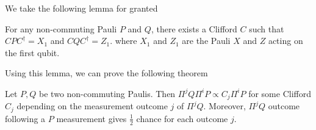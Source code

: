We take the following lemma for granted
\begin{lemma}\label{lemma:clifford-non-commuting}
	For any non-commuting Pauli $P$ and $Q$, there exists a Clifford $C$ such that $C P C^\dagger = X_1$ and $C Q C^\dagger = Z_1$. where $X_1$ and $Z_1$ are the Pauli $X$ and $Z$ acting on the first qubit.
\end{lemma}

Using this lemma, we can prove the following theorem

\begin{theorem}\label{theorem:non-commuting-pauli}
	Let $P, Q$ be two non-commuting Paulis. 
	Then $\Pi^j Q \Pi^i P \propto C_j \Pi^i P$ for some Clifford $C_j$ depending on the measurement outcome $j$ of $\Pi^j Q$.
	Moreover, $\Pi^j Q$ outcome following a $P$ measurement gives $\frac{1}{2}$ chance for each outcome $j$.
\end{theorem}

